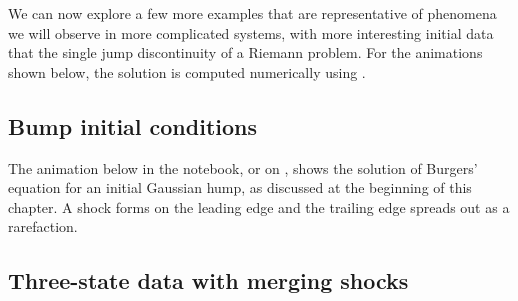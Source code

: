 \documentclass{SIAMbook2016}
\begin{document}
We can now explore a few more examples that are representative of
phenomena we will observe in more complicated systems, with more
interesting initial data that the single jump discontinuity of a Riemann
problem. For the animations shown below, the solution is computed
numerically using .

\hypertarget{bump-initial-conditions}{%
\subsection{Bump initial conditions}\label{bump-initial-conditions}}

The animation below in the notebook, or on
, shows the solution of Burgers' equation for an initial
Gaussian hump, as discussed at the beginning of this chapter. A shock
forms on the leading edge and the trailing edge spreads out as a
rarefaction.

\hypertarget{three-state-data-with-merging-shocks}{%
\subsection{Three-state data with merging
shocks}\label{three-state-data-with-merging-shocks}}
\end{document}
